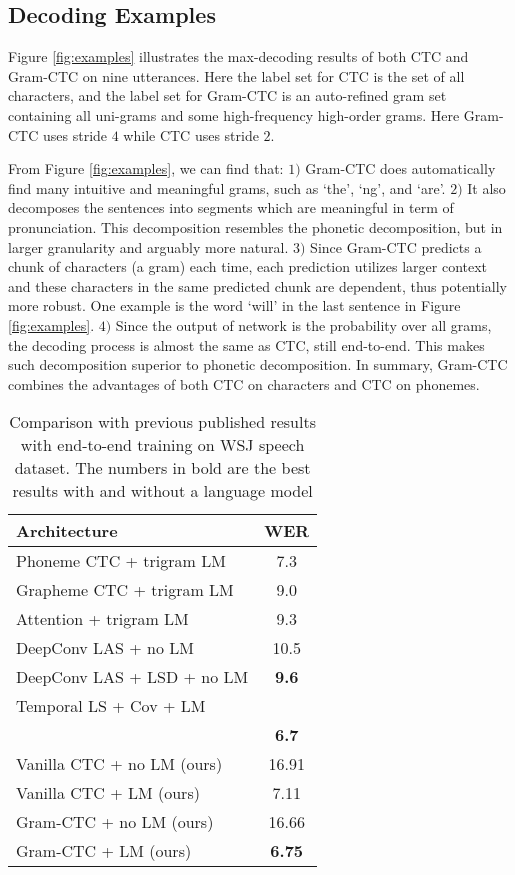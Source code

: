 \documentclass{article}
\begin{document}
\subsection{Decoding Examples}

Figure \ref{fig:examples} illustrates the max-decoding results of both CTC and Gram-CTC on nine utterances. Here the label set for CTC is the set of all characters, and the label set for Gram-CTC is an auto-refined gram set containing all uni-grams and some high-frequency high-order grams. Here Gram-CTC uses stride $4$ while CTC uses stride $2$.

From Figure \ref{fig:examples}, we can find that: $1)$ Gram-CTC does automatically find many intuitive and meaningful grams, such as `the', `ng', and `are'. $2)$ It also decomposes the sentences into segments which are meaningful in term of pronunciation. This decomposition resembles the phonetic decomposition, but in larger granularity and arguably more natural. $3)$ Since Gram-CTC predicts a chunk of characters (a gram) each time, each prediction utilizes larger context and these characters in the same predicted chunk are dependent, thus potentially more robust. One example is the word `will' in the last sentence in Figure \ref{fig:examples}. $4)$ Since the output of network is the probability over all grams, the decoding process is almost the same as CTC, still end-to-end. This makes such decomposition superior to phonetic decomposition. In summary, Gram-CTC combines the advantages of both CTC on characters and CTC on phonemes.

\begin{table}[t]
\begin{center}
\small{
\begin{tabular}{l|c}
\toprule
Architecture &  WER  \\
\midrule
Phoneme CTC + trigram LM  \cite{miao2015eesen}  & 7.3 \\
Grapheme CTC + trigram LM  \cite{miao2015eesen}  & 9.0 \\
Attention + trigram LM   \cite{bahdanau2016end} &   9.3 \\ 
DeepConv LAS + no LM  \cite{zhang2016very} & 10.5 \\
DeepConv LAS + LSD + no LM  \cite{chan2016lsd}  & \textbf{9.6} \\
Temporal LS + Cov + LM \\~~\cite{chorowski2016seq2seq} & \textbf{6.7} \\
\midrule
Vanilla CTC + no LM  (ours)  & 16.91  \\
Vanilla CTC + LM  (ours)  & 7.11 \\ 
\midrule
Gram-CTC + no LM (ours)  & 16.66 \\
Gram-CTC + LM (ours)  & \textbf{6.75} \\
\bottomrule
\end{tabular}
}
\end{center}
\vspace{-10pt}
\caption{Comparison with previous published results with end-to-end training on WSJ speech dataset. The numbers in bold are the best results with and without a language model}
\label{table:wsj_sota}
\end{table}
\end{document}
